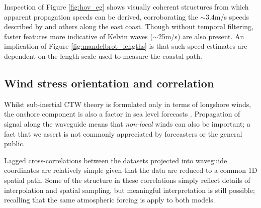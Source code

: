 Inspection of Figure \ref{fig:hov_eg} shows visually coherent structures from which apparent propagation speeds can be derived, corroborating the $\sim$3.4m/s speeds described by \citet{Woodham:2013cl} and others along the east coast.
Though without temporal filtering, faster features more indicative of Kelvin waves ($\sim$25m/s) are also present.   
An implication of Figure \ref{fig:mandelbrot_lengths} is that such speed estimates are dependent on the length scale used to measure the coastal path. 

\subsection{Wind stress orientation and correlation}
Whilst sub-inertial CTW theory is formulated only in terms of longshore winds, the onshore component is also a factor in sea level forecasts \citep{Tilburg:2004cg}.
Propagation of signal along the waveguide means that \emph{non-local} winds can also be important; a fact that we assert is not commonly appreciated by forecasters or the general public. 


Lagged cross-correlations between the datasets projected into waveguide coordinates are relatively simple given that the data are reduced to a common 1D spatial path. 
Some of the structure in these correlations simply reflect details of interpolation and spatial sampling, but meaningful interpretation is still possible; recalling that the same atmospheric forcing is apply to both models.


